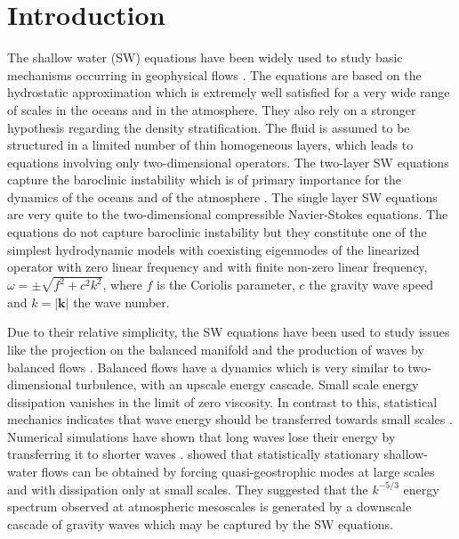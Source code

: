 \documentclass{jfm}
\newcommand{\kk}{\textbf{k}}
\begin{document}
\section{Introduction}

The shallow water (SW) equations  have been widely used to study basic
mechanisms occurring in geophysical flows \cite[see for
example][]{VallisLIVRE2006}.
%
The equations are based on the hydrostatic approximation which is
extremely well satisfied for a very wide range of scales in the oceans
and in the atmosphere.  They also rely on a stronger hypothesis
regarding the density stratification.  The fluid is assumed to be
structured in a limited number of thin homogeneous layers, which leads
to equations involving only two-dimensional operators. The two-layer
SW equations capture the baroclinic instability which is of
primary importance for the dynamics of the oceans and of the
atmosphere \cite[]{VallisLIVRE2006, Wirth2013}.
%
The single layer SW equations are very quite to
the two-dimensional compressible Navier-Stokes equations.  The
equations do not capture baroclinic instability but they constitute
one of the simplest hydrodynamic models with coexisting eigenmodes of
the linearized operator with zero linear frequency and with finite
non-zero linear frequency, $\omega = \pm\sqrt{f^2 + c^2
k^2}$, where $f$ is the Coriolis parameter, $c$ the gravity wave speed and $k
= |\kk|$ the wave number.
%

%
Due to their relative simplicity, the SW equations have
been used to study issues like the projection on the balanced manifold
\cite[]{Lorenz1980, MohebalhojehDritschel2000} and the production of
waves by balanced flows \cite[]{FargeSadourny1989,
LahayeZeitlin2012,Vanneste2013}. Balanced flows have a dynamics which is very similar to
two-dimensional turbulence, with an upscale energy cascade. %
Small scale energy dissipation vanishes in the limit of zero
viscosity.
%
In contrast to this, statistical mechanics indicates that wave energy
should be transferred towards small scales \cite[]{Warn1986}.
Numerical simulations have shown that long waves lose their energy by
transferring it to shorter waves \cite[]{Sadourny1975,
FargeSadourny1989}.   \cite{YuanHamilton1994} showed that
statistically stationary shallow-water flows can be obtained by forcing
quasi-geostrophic modes at large scales and with dissipation only at
small scales. They suggested that the $ k^{-5/3} $ energy spectrum observed at   atmospheric mesoscales  \cite[]{NastromGage1985,LiLindborg2018} is generated by a downscale cascade of gravity waves which may be captured by the SW equations. 
\end{document}
